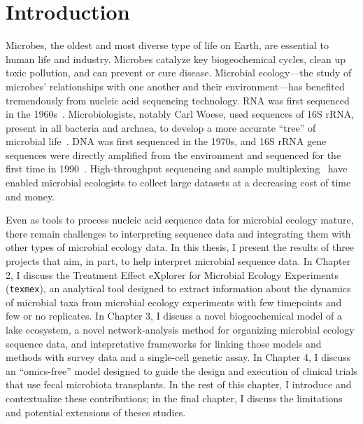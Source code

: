 \chapter{Introduction}

Microbes, the oldest and most diverse type of life on Earth, are essential to
human life and industry. Microbes catalyze key biogeochemical cycles, clean up
toxic pollution, and can prevent or cure disease. Microbial ecology---the study of
microbes' relationships with one another and their environment---has
benefited tremendously from nucleic acid sequencing technology. RNA was first
sequenced in the 1960s~\cite{sanger_two_1965}. Microbiologists, notably Carl
Woese, used sequences of 16S rRNA, present in all bacteria and archaea, to
develop a more accurate ``tree'' of microbial
life~\cite{woese_phylogenetic_1977,pace_phylogeny_2012}. DNA was first
sequenced in the 1970s, and 16S rRNA gene sequences were directly amplified
from the environment and sequenced for the first time in
1990~\cite{giovannoni_genetic_1990,case_use_2007}. High-throughput sequencing
and sample multiplexing~\cite{hamady_error_2008} have enabled microbial
ecologists to collect large datasets at a decreasing cost of time and money.

Even as tools to process nucleic acid sequence data for microbial ecology
mature, there remain challenges to interpreting sequence data and integrating
them with other types of microbial ecology data. In this thesis, I present
the results of three projects that aim, in part, to help interpret microbial
sequence data. In Chapter 2, I discuss the Treatment Effect eXplorer for
Microbial Ecology Experiments (\texttt{texmex}), an analytical tool designed to
extract information about the dynamics of microbial taxa from microbial
ecology experiments with few timepoints and few or no replicates. In Chapter 3,
I discuss a novel biogeochemical model of a lake ecosystem, a novel
network-analysis method for organizing microbial ecology sequence data,
and intepretative frameworks for linking those models and methods with
survey data and a single-cell genetic assay. In Chapter 4, I discuss an
``omics-free'' model designed to guide the design and execution of clinical
trials that use fecal microbiota transplants. In the rest of this chapter,
I introduce and contextualize these contributions; in the final chapter,
I discuss the limitations and potential extensions of theses studies.

